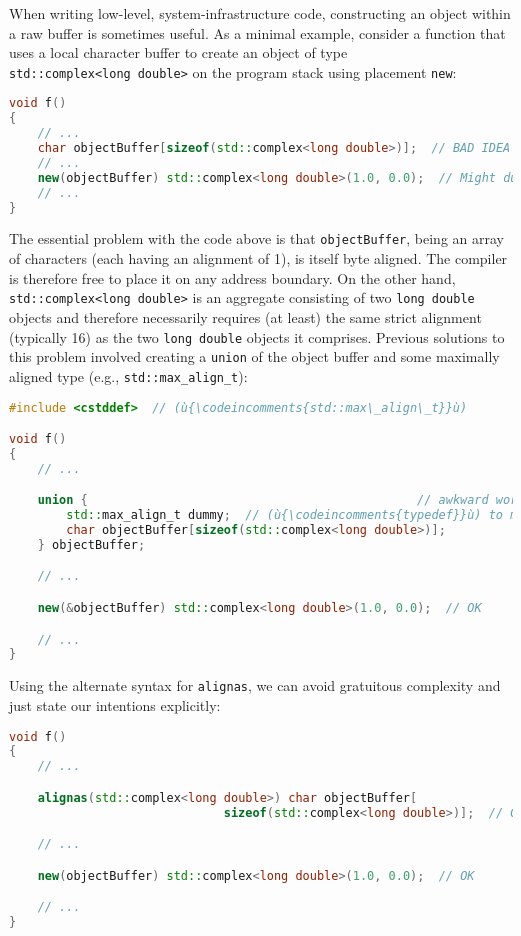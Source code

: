 When writing low-level, system-infrastructure code, constructing an object within a raw buffer is sometimes useful. As a minimal
example, consider a function that uses a local character buffer to
create an object of type \texttt{std::complex<long}~\texttt{double>} on
the program stack using placement \texttt{new}:

\begin{lstlisting}[language=C++]
void f()
{
    // ...
    char objectBuffer[sizeof(std::complex<long double>)];  // BAD IDEA
    // ...
    new(objectBuffer) std::complex<long double>(1.0, 0.0);  // Might dump core!
    // ...
}
\end{lstlisting}

\noindent The essential problem with the code above is that \texttt{objectBuffer},
being an array of characters (each having an alignment of 1), is itself
byte aligned. The compiler is therefore free to place it on any address
boundary. On the other hand, \texttt{std::complex<long}~\texttt{double>} is an aggregate consisting of two \texttt{long}~\texttt{double} objects
and therefore necessarily requires (at least) the same strict alignment
(typically 16) as the two \texttt{long}~\texttt{double} objects it comprises. Previous
solutions to this problem involved creating a \texttt{union} of the
object buffer and some maximally aligned type (e.g.,
\texttt{std::max\_align\_t}):

\begin{lstlisting}[language=C++]
#include <cstddef>  // (ù{\codeincomments{std::max\_align\_t}}ù)

void f()
{
    // ...

    union {                                              // awkward workaround
        std::max_align_t dummy;  // (ù{\codeincomments{typedef}}ù) to maximally aligned type
        char objectBuffer[sizeof(std::complex<long double>)];
    } objectBuffer;

    // ...

    new(&objectBuffer) std::complex<long double>(1.0, 0.0);  // OK

    // ...
}
\end{lstlisting}

\noindent Using the alternate syntax for \texttt{alignas}, we can avoid gratuitous
complexity and just state our intentions explicitly:

\begin{lstlisting}[language=C++]
void f()
{
    // ...

    alignas(std::complex<long double>) char objectBuffer[
                              sizeof(std::complex<long double>)];  // GOOD IDEA

    // ...

    new(objectBuffer) std::complex<long double>(1.0, 0.0);  // OK

    // ...
}
\end{lstlisting}


